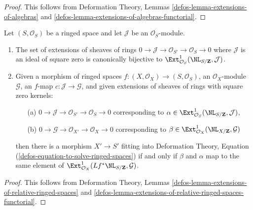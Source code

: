\begin{proof}
This follows from Deformation Theory, Lemmas
\ref{defos-lemma-extensions-of-algebras} and
\ref{defos-lemma-extensions-of-algebras-functorial}.
\end{proof}

\begin{lemma}
\label{lemma-extensions-of-ringed-spaces}
Let $(S, \mathcal{O}_S)$ be a ringed space and let $\mathcal{J}$
be an $\mathcal{O}_S$-module.
\begin{enumerate}
\item The set of extensions of sheaves of rings
$0 \to \mathcal{J} \to \mathcal{O}_{S'} \to \mathcal{O}_S \to 0$
where $\mathcal{J}$ is an ideal of square zero is canonically bijective to
$\Ext^1_{\mathcal{O}_S}(\NL_{S/\mathbf{Z}}, \mathcal{J})$.
\item Given a morphism of ringed spaces
$f : (X, \mathcal{O}_X) \to (S, \mathcal{O}_S)$, an $\mathcal{O}_X$-module
$\mathcal{G}$, an $f$-map $c : \mathcal{J} \to \mathcal{G}$, and
given extensions of sheaves of rings with square zero kernels:
\begin{enumerate}
\item[(a)] $0 \to \mathcal{J} \to \mathcal{O}_{S'} \to \mathcal{O}_S \to 0$
corresponding to
$\alpha \in \Ext^1_{\mathcal{O}_S}(\NL_{S/\mathbf{Z}}, \mathcal{J})$,
\item[(b)] $0 \to \mathcal{G} \to \mathcal{O}_{X'} \to \mathcal{O}_X \to 0$
corresponding to
$\beta \in \Ext^1_{\mathcal{O}_X}(\NL_{X/\mathbf{Z}}, \mathcal{G})$
\end{enumerate}
then there is a morphism $X' \to S'$ fitting into
Deformation Theory, Equation
(\ref{defos-equation-to-solve-ringed-spaces})
if and only if $\beta$ and $\alpha$
map to the same element of
$\Ext^1_{\mathcal{O}_X}(Lf^*\NL_{S/\mathbf{Z}}, \mathcal{G})$.
\end{enumerate}
\end{lemma}

\begin{proof}
This follows from Deformation Theory, Lemmas
\ref{defos-lemma-extensions-of-relative-ringed-spaces} and
\ref{defos-lemma-extensions-of-relative-ringed-spaces-functorial}.
\end{proof}

